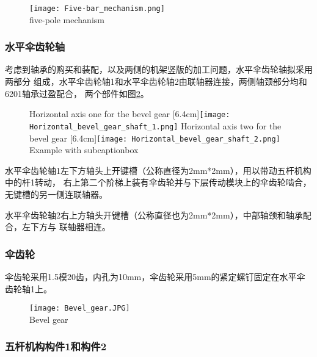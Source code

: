 \begin{figure}[!htp]
  \centering
  \texttt{[image: Five-bar\_mechanism.png]} \\
    {five-pole mechanism}
  \label{fig:五杆机构}
\end{figure}

\subsubsection{水平伞齿轮轴}

考虑到轴承的购买和装配，以及两侧的机架竖版的加工问题，水平伞齿轮轴拟采用两部分
组成，水平伞齿轮轴1和水平伞齿轮轴2由联轴器连接，两侧轴颈部分均和6201轴承过盈配合，
两个部件如图\ref{fig:bisubcaptionbox}。

\begin{figure}[!hbtp]
  \centering
                  {Horizontal axis one for the bevel gear}%
                  [6.4cm]{\texttt{[image: Horizontal\_bevel\_gear\_shaft\_1.png]}}
  \hspace{1cm}
                  {Horizontal axis two for the bevel gear}%
                  [6.4cm]{\texttt{[image: Horizontal\_bevel\_gear\_shaft\_2.png]}}
            {Example with subcaptionbox}
  \label{fig:bisubcaptionbox}
\end{figure}

水平伞齿轮轴1左下方轴头上开键槽（公称直径为2mm*2mm），用以带动五杆机构中的杆1转动，
右上第二个阶梯上装有伞齿轮并与下层传动模块上的伞齿轮啮合，无键槽的另一侧连联轴器。


水平伞齿轮轴2右上方轴头开键槽（公称直径也为2mm*2mm），中部轴颈和轴承配合，左下方与
联轴器相连。

\subsubsection{伞齿轮}
伞齿轮采用1.5模20齿，内孔为10mm，伞齿轮采用5mm的紧定螺钉固定在水平伞齿轮轴1上。
\begin{figure}[!htp]
  \centering
  \texttt{[image: Bevel\_gear.JPG]} \\
    {Bevel gear}
  \label{fig:伞齿轮}
\end{figure}

\subsubsection{五杆机构构件1和构件2}

